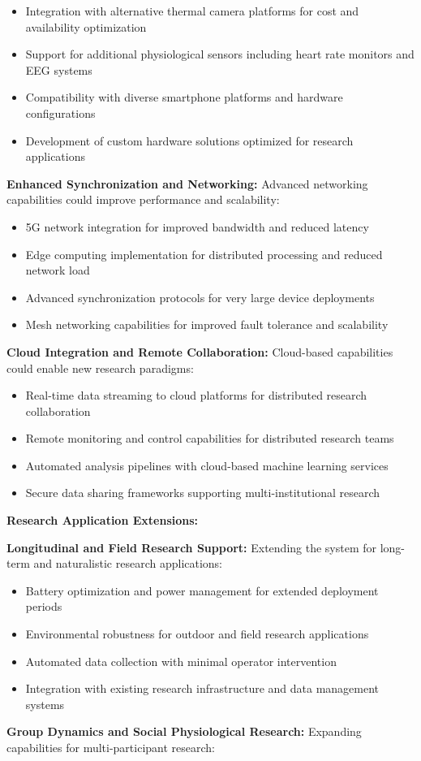 \documentclass[12pt,a4paper]{report}
\begin{document}
\begin{itemize}
\item Integration with alternative thermal camera platforms for cost and availability optimization
\item Support for additional physiological sensors including heart rate monitors and EEG systems
\item Compatibility with diverse smartphone platforms and hardware configurations
\item Development of custom hardware solutions optimized for research applications

\end{itemize}
\textbf{Enhanced Synchronization and Networking:}
Advanced networking capabilities could improve performance and scalability:

\begin{itemize}
\item 5G network integration for improved bandwidth and reduced latency
\item Edge computing implementation for distributed processing and reduced network load
\item Advanced synchronization protocols for very large device deployments
\item Mesh networking capabilities for improved fault tolerance and scalability

\end{itemize}
\textbf{Cloud Integration and Remote Collaboration:}
Cloud-based capabilities could enable new research paradigms:

\begin{itemize}
\item Real-time data streaming to cloud platforms for distributed research collaboration
\item Remote monitoring and control capabilities for distributed research teams
\item Automated analysis pipelines with cloud-based machine learning services
\item Secure data sharing frameworks supporting multi-institutional research

\end{itemize}
\textbf{Research Application Extensions:}

\textbf{Longitudinal and Field Research Support:}
Extending the system for long-term and naturalistic research applications:

\begin{itemize}
\item Battery optimization and power management for extended deployment periods
\item Environmental robustness for outdoor and field research applications
\item Automated data collection with minimal operator intervention
\item Integration with existing research infrastructure and data management systems

\end{itemize}
\textbf{Group Dynamics and Social Physiological Research:}
Expanding capabilities for multi-participant research:
\end{document}

